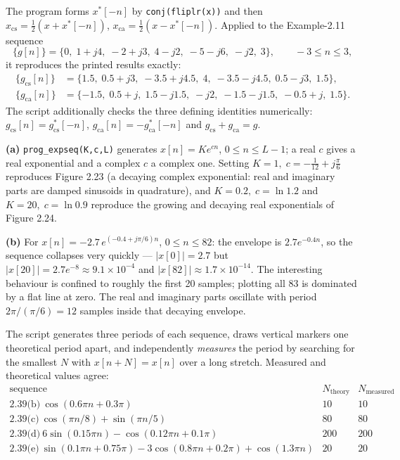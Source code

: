 The program forms $x^*[-n]$ by \texttt{conj(fliplr(x))} and then
$x_{\mathrm{cs}}=\tfrac12(x+x^*[-n])$, $x_{\mathrm{ca}}=\tfrac12(x-x^*[-n])$.
Applied to the Example-2.11 sequence
\[
\{g[n]\}=\{0,\;1+j4,\;-2+j3,\;4-j2,\;-5-j6,\;-j2,\;3\},\qquad -3\le n\le 3,
\]
it reproduces the printed results exactly:
\[
\begin{aligned}
\{g_{\mathrm{cs}}[n]\}&=\{1.5,\;0.5+j3,\;-3.5+j4.5,\;4,\;-3.5-j4.5,\;0.5-j3,\;1.5\},\\
\{g_{\mathrm{ca}}[n]\}&=\{-1.5,\;0.5+j,\;1.5-j1.5,\;-j2,\;-1.5-j1.5,\;-0.5+j,\;1.5\}.
\end{aligned}
\]
The script additionally checks the three defining identities numerically:
$g_{\mathrm{cs}}[n]=g^*_{\mathrm{cs}}[-n]$, $g_{\mathrm{ca}}[n]=-g^*_{\mathrm{ca}}[-n]$ and
$g_{\mathrm{cs}}+g_{\mathrm{ca}}=g$.




\textbf{(a)} \texttt{prog\_expseq(K,c,L)} generates $x[n]=K e^{cn}$, $0\le n\le L-1$; a real
$c$ gives a real exponential and a complex $c$ a complex one. Setting
$K=1,\;c=-\tfrac1{12}+j\tfrac{\pi}{6}$ reproduces Figure 2.23 (a decaying complex exponential:
real and imaginary parts are damped sinusoids in quadrature), and $K=0.2,\;c=\ln 1.2$ and
$K=20,\;c=\ln 0.9$ reproduce the growing and decaying real exponentials of Figure 2.24.

\textbf{(b)} For $x[n]=-2.7\,e^{(-0.4+j\pi/6)n}$, $0\le n\le 82$: the envelope is
$2.7e^{-0.4n}$, so the sequence collapses very quickly ---
$|x[0]|=2.7$ but $|x[20]|=2.7e^{-8}\approx 9.1\times10^{-4}$ and
$|x[82]|\approx 1.7\times10^{-14}$. The interesting behaviour is confined to roughly the first
20 samples; plotting all 83 is dominated by a flat line at zero. The real and imaginary parts
oscillate with period $2\pi/(\pi/6)=12$ samples inside that decaying envelope.


The script generates three periods of each sequence, draws vertical markers one theoretical
period apart, and independently \emph{measures} the period by searching for the smallest $N$
with $x[n+N]=x[n]$ over a long stretch. Measured and theoretical values agree:
\[
\begin{array}{lcc}
\text{sequence} & N_{\text{theory}} & N_{\text{measured}}\\\hline
\text{2.39(b)}\ \cos(0.6\pi n+0.3\pi) & 10 & 10\\
\text{2.39(c)}\ \cos(\pi n/8)+\sin(\pi n/5) & 80 & 80\\
\text{2.39(d)}\ 6\sin(0.15\pi n)-\cos(0.12\pi n+0.1\pi) & 200 & 200\\
\text{2.39(e)}\ \sin(0.1\pi n+0.75\pi)-3\cos(0.8\pi n+0.2\pi)+\cos(1.3\pi n) & 20 & 20
\end{array}
\]

